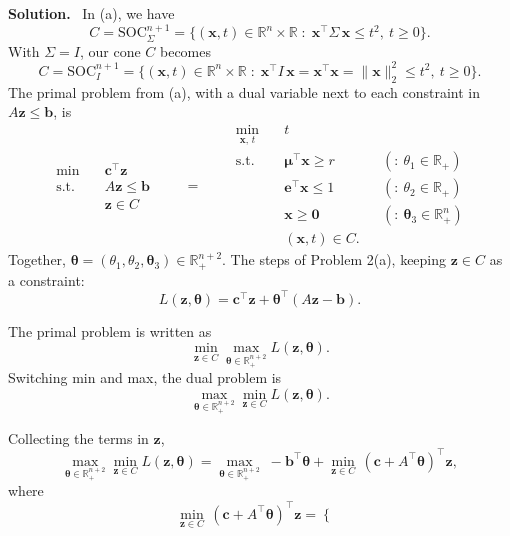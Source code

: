 \documentclass[10pt]{article}
\newenvironment{solution}
  {\par\smallskip\begingroup\color{solink}\textbf{Solution.}\ }
  {\par\endgroup}
\begin{document}
\begin{parts}
\begin{solution}
In (a), we have
\[
  C = \mathrm{SOC}_{\Sigma}^{n+1}
    = \big\{ (\bm{x}, t) \in \mathbb{R}^n \times \mathbb{R} \;:\; \bm{x}^{\top}\Sigma\, \bm{x} \le t^2,\ t \ge 0 \big\}.
\]
With $\Sigma = I$, our cone $C$ becomes
\[
  C = \mathrm{SOC}_{I}^{n+1}
    = \big\{ (\bm{x}, t) \in \mathbb{R}^n \times \mathbb{R} \;:\; \bm{x}^{\top}I\,\bm{x} = \bm{x}^{\top}\bm{x} = \|\bm{x}\|_2^2 \le t^2,\ t \ge 0 \big\}.
\]
The primal problem from (a), with a dual variable next to each constraint in $A\bm{z} \le \bm{b}$, is
\[
\begin{aligned}
  \min \quad & \bm{c}^{\top}\bm{z} \\
  \text{s.t.} \quad & A\bm{z} \le \bm{b} \\
                    & \bm{z} \in C
\end{aligned}
\qquad = \qquad
\begin{aligned}
  \min_{\bm{x},\, t} \quad & t \\
  \text{s.t.} \quad & \bm{\mu}^{\top}\bm{x} \ge r & & ({:}\ \theta_1 \in \mathbb{R}_+) \\
                    & \bm{e}^{\top}\bm{x} \le 1 & & ({:}\ \theta_2 \in \mathbb{R}_+) \\
                    & \bm{x} \ge \bm{0} & & ({:}\ \bm{\theta}_3 \in \mathbb{R}^n_+) \\
                    & (\bm{x}, t) \in C .
\end{aligned}
\]
Together, $\bm{\theta} = (\theta_1, \theta_2, \bm{\theta}_3) \in \mathbb{R}^{n+2}_+$.
The steps of Problem 2(a), keeping $\bm{z} \in C$ as a constraint:
\[
  L(\bm{z}, \bm{\theta}) = \bm{c}^{\top}\bm{z} + \bm{\theta}^{\top}(A\bm{z} - \bm{b}).
\]
\begin{steps}
\item The primal problem is written as
  \[
    \min_{\bm{z} \in C} \max_{\bm{\theta} \in \mathbb{R}^{n+2}_+} L(\bm{z}, \bm{\theta}).
  \]
  Switching min and max, the dual problem is
  \[
    \max_{\bm{\theta} \in \mathbb{R}^{n+2}_+} \min_{\bm{z} \in C} L(\bm{z}, \bm{\theta}).
  \]
\item Collecting the terms in $\bm{z}$,
  \[
    \max_{\bm{\theta} \in \mathbb{R}^{n+2}_+} \min_{\bm{z} \in C} L(\bm{z}, \bm{\theta})
    = \max_{\bm{\theta} \in \mathbb{R}^{n+2}_+} \; -\bm{b}^{\top}\bm{\theta} + \min_{\bm{z} \in C} \, (\bm{c} + A^{\top}\bm{\theta})^{\top}\bm{z} ,
  \]
  where
  \[
    \min_{\bm{z} \in C} \, (\bm{c} + A^{\top}\bm{\theta})^{\top}\bm{z} =
    \begin{cases}

\end{cases}\]
\end{steps}
\end{solution}
\end{parts}
\end{document}
